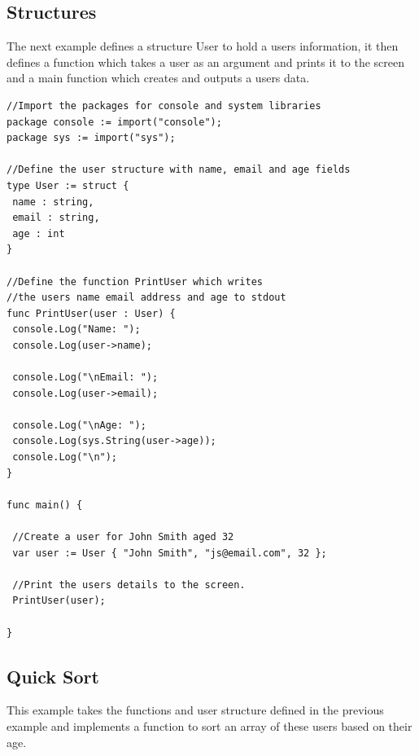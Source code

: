 \documentclass[]{final_report}
\begin{document}
\subsection{Structures}

The next example defines a structure User to hold a users information, it then defines a function which takes a user as an argument and prints it to the screen and a main function which creates and outputs a users data.

\begin{verbatim}
//Import the packages for console and system libraries
package console := import("console");
package sys := import("sys");

//Define the user structure with name, email and age fields
type User := struct {
 name : string,
 email : string,
 age : int
}

//Define the function PrintUser which writes 
//the users name email address and age to stdout
func PrintUser(user : User) {
 console.Log("Name: ");
 console.Log(user->name);
 
 console.Log("\nEmail: ");
 console.Log(user->email);
 
 console.Log("\nAge: ");
 console.Log(sys.String(user->age));
 console.Log("\n");
}

func main() {
 
 //Create a user for John Smith aged 32
 var user := User { "John Smith", "js@email.com", 32 };

 //Print the users details to the screen.
 PrintUser(user);

}
\end{verbatim}

\subsection{Quick Sort}

This example takes the functions and user structure defined in the previous example and implements a function to sort an array of these users based on their age.
\end{document}
